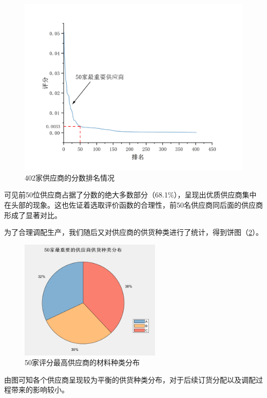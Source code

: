 \documentclass{my_paper}
\begin{document}
\begin {figure}[h]
\centering %
\includegraphics[width=\textwidth]{Graph1.jpg}
\caption{402家供应商的分数排名情况} %
\label{zx}
\end {figure}

\newpage
可见前50位供应商占据了分数的绝大多数部分（68.1\%），呈现出优质供应商集中在头部的现象。这也佐证着选取评价函数的合理性，前50名供应商同后面的供应商形成了显著对比。

为了合理调配生产，我们随后又对供应商的供货种类进行了统计，得到饼图（\ref{bingtu}）。
\begin {figure}[h]
\centering %
\includegraphics[width=0.6\textwidth]{bingtu.png}
\caption{50家评分最高供应商的材料种类分布} %
\label{bingtu}
\end {figure}

\newpage
由图可知各个供应商呈现较为平衡的供货种类分布，对于后续订货分配以及调配过程带来的影响较小。
\end{document}
